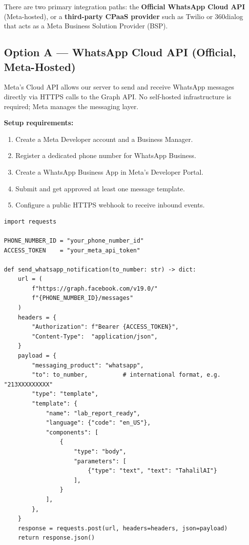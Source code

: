 \documentclass[12pt,a4paper]{article}
\begin{document}
There are two primary integration paths: the \textbf{Official WhatsApp Cloud
API} (Meta-hosted), or a \textbf{third-party CPaaS provider} such as Twilio
or 360dialog that acts as a Meta Business Solution Provider (BSP).

\subsection{Option A --- WhatsApp Cloud API (Official, Meta-Hosted)}

Meta's Cloud API allows our server to send and receive WhatsApp messages
directly via HTTPS calls to the Graph API. No self-hosted infrastructure is
required; Meta manages the messaging layer.

\textbf{Setup requirements:}
\begin{enumerate}[leftmargin=2em, itemsep=2pt]
    \item Create a Meta Developer account and a Business Manager.
    \item Register a dedicated phone number for WhatsApp Business.
    \item Create a WhatsApp Business App in Meta's Developer Portal.
    \item Submit and get approved at least one message template.
    \item Configure a public HTTPS webhook to receive inbound events.
\end{enumerate}

\begin{lstlisting}[style=python, caption={Meta Cloud API: send a template message (Python/requests)}]
import requests

PHONE_NUMBER_ID = "your_phone_number_id"
ACCESS_TOKEN    = "your_meta_api_token"

def send_whatsapp_notification(to_number: str) -> dict:
    url = (
        f"https://graph.facebook.com/v19.0/"
        f"{PHONE_NUMBER_ID}/messages"
    )
    headers = {
        "Authorization": f"Bearer {ACCESS_TOKEN}",
        "Content-Type":  "application/json",
    }
    payload = {
        "messaging_product": "whatsapp",
        "to": to_number,          # international format, e.g. "213XXXXXXXXX"
        "type": "template",
        "template": {
            "name": "lab_report_ready",
            "language": {"code": "en_US"},
            "components": [
                {
                    "type": "body",
                    "parameters": [
                        {"type": "text", "text": "TahalilAI"}
                    ],
                }
            ],
        },
    }
    response = requests.post(url, headers=headers, json=payload)
    return response.json()
\end{lstlisting}
\end{document}
